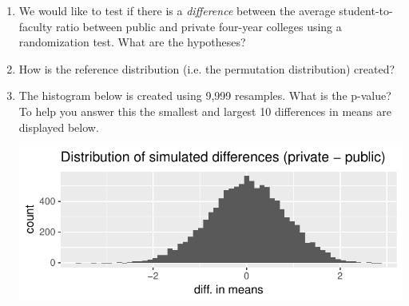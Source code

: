 \documentclass{article}\usepackage[]{graphicx}\usepackage[]{color}
\makeatletter
\def\maxwidth{ %
  \ifdim\Gin@nat@width>\linewidth
    \linewidth
  \else
    \Gin@nat@width
  \fi
}
\newenvironment{knitrout}{}{} %
\makeatother
\begin{document}
\begin{enumerate}

\item We would like to test if there is a \emph{difference} between the average student-to-faculty ratio between public and private four-year colleges using a randomization test. What are the hypotheses?

\vspace{.5in}

\item How is the reference distribution (i.e. the permutation distribution) created?

\vspace{1in}

% 


\item The histogram below is created using 9,999 resamples. What is the p-value? To help you answer this the smallest and largest 10 differences in means are displayed below.


\begin{knitrout}
\color{fgcolor}
\includegraphics[width=\maxwidth]{figure/unnamed-chunk-2-1} 


\end{knitrout}
\end{enumerate}
\end{document}
